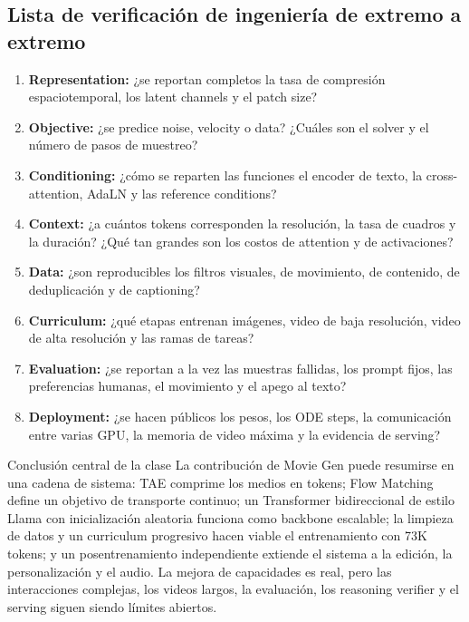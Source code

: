 \documentclass[a4paper]{article}
\begin{document}
\subsection{Lista de verificación de ingeniería de extremo a extremo}

\begin{enumerate}
  \item \textbf{Representation:} ¿se reportan completos la tasa de compresión espaciotemporal, los latent channels y el patch size?
  \item \textbf{Objective:} ¿se predice noise, velocity o data? ¿Cuáles son el solver y el número de pasos de muestreo?
  \item \textbf{Conditioning:} ¿cómo se reparten las funciones el encoder de texto, la cross-attention, AdaLN y las reference conditions?
  \item \textbf{Context:} ¿a cuántos tokens corresponden la resolución, la tasa de cuadros y la duración? ¿Qué tan grandes son los costos de attention y de activaciones?
  \item \textbf{Data:} ¿son reproducibles los filtros visuales, de movimiento, de contenido, de deduplicación y de captioning?
  \item \textbf{Curriculum:} ¿qué etapas entrenan imágenes, video de baja resolución, video de alta resolución y las ramas de tareas?
  \item \textbf{Evaluation:} ¿se reportan a la vez las muestras fallidas, los prompt fijos, las preferencias humanas, el movimiento y el apego al texto?
  \item \textbf{Deployment:} ¿se hacen públicos los pesos, los ODE steps, la comunicación entre varias GPU, la memoria de video máxima y la evidencia de serving?
\end{enumerate}

\begin{importantbox}{Conclusión central de la clase}
La contribución de Movie Gen puede resumirse en una cadena de sistema: TAE comprime los medios en tokens; Flow Matching define un objetivo de transporte continuo; un Transformer bidireccional de estilo Llama con inicialización aleatoria funciona como backbone escalable; la limpieza de datos y un curriculum progresivo hacen viable el entrenamiento con 73K tokens; y un posentrenamiento independiente extiende el sistema a la edición, la personalización y el audio. La mejora de capacidades es real, pero las interacciones complejas, los videos largos, la evaluación, los reasoning verifier y el serving siguen siendo límites abiertos.
\end{importantbox}
\end{document}
